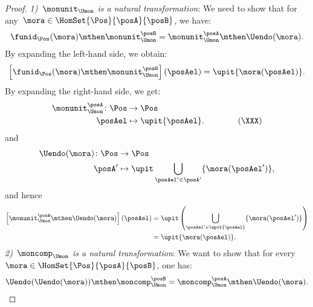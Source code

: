 \begin{proof}
    \emph{1)~$\monunit_{\Umon}$ is a natural transformation}:
    We need to show that for any~$\mora\in \HomSet{\Pos}{\posA}{\posB}$, we have:
    \begin{equation}
        \funid_{\Pos}(\mora)\mthen \monunit_{\Umon}^\posB=\monunit_{\Umon}^\posA\mthen \Uendo(\mora).
    \end{equation}
    By expanding the left-hand side, we obtain:
    \begin{equation}
        \left[\funid_{\Pos}(\mora)\mthen \monunit_{\Umon}^\posB\right](\posAel)=\upit \{\mora(\posAel)\}.
    \end{equation}
    By expanding the right-hand side, we get:
    \begin{equation}
        \begin{aligned}
            \monunit_{\Umon}^\posA\colon \Pos & \to \Pos \\
            \posAel                           & \mapsto \upit \{\posAel\}.
            \qquad \qquad (\XXX)
        \end{aligned}
    \end{equation}
    and
    \begin{equation}
        \begin{aligned}
            \Uendo(\mora)\colon \Pos & \to \Pos \\
            \posA'                   & \mapsto \upit \bigcup_{\posAel'\in \posA'}\{\mora(\posAel')\},
        \end{aligned}
    \end{equation}
    and hence
    \begin{equation}
        \begin{aligned}
            \left[\monunit_{\Umon}^\posA\mthen \Uendo(\mora)\right](\posAel) & =\upit \left( \bigcup_{\posAel'\in \upit \{\posAel\}} \{\mora(\posAel')\}\right) \\
                                                                             & =\upit \{\mora(\posAel)\}.
        \end{aligned}
    \end{equation}
    \emph{2)~$\moncomp_{\Umon}$ is a natural transformation}:
    We want to show that for every~$\mora\in \HomSet{\Pos}{\posA}{\posB}$, one has:
    \begin{equation}
        \Uendo(\Uendo(\mora))\mthen \moncomp_{\Umon}^{\posB}=\moncomp_{\Umon}^\posA \mthen \Uendo(\mora).
    \end{equation}

\end{proof}
